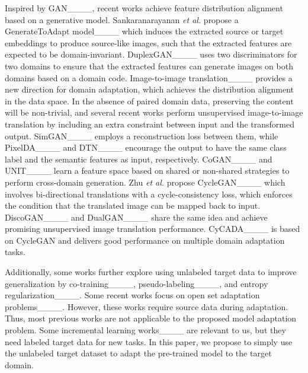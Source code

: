 Inspired by GAN____, recent works achieve feature distribution alignment based on a generative model. Sankaranarayanan \textit{et al.} propose a GenerateToAdapt model____ which induces the extracted source or target embeddings to produce source-like images, such that the extracted features are expected to be domain-invariant. DuplexGAN____ uses two discriminators for two domains to ensure that the extracted features can generate images on both domains based on a domain code. Image-to-image translation____ provides a new direction for domain adaptation, which achieves the distribution alignment in the data space. In the absence of paired domain data, preserving the content will be non-trivial, and several recent works perform unsupervised image-to-image translation by including an extra constraint between input and the transformed output. SimGAN____ employs a reconstruction loss between them, while PixelDA____ and DTN____ encourage the output to have the same class label and the semantic features as input, respectively. CoGAN____ and UNIT____ learn a feature space based on shared or non-shared strategies to perform cross-domain generation. Zhu \textit{et al.} propose CycleGAN____ which involves bi-directional translations with a cycle-consistency loss, which enforces the condition that the translated image can be mapped back to input. DiscoGAN____ and DualGAN____ share the same idea and achieve promising unsupervised image translation performance. CyCADA____ is based on CycleGAN and delivers good performance on multiple domain adaptation tasks.

Additionally, some works further explore using unlabeled target data to improve generalization by co-training____, pseudo-labeling____, and entropy regularization____. Some recent works focus on open set adaptation problems____. However, these works require source data during adaptation. Thus, most previous works are not applicable to the proposed model adaptation problem. Some incremental learning works____ are relevant to us, but they need labeled target data for new tasks. In this paper, we propose to simply use the unlabeled target dataset to adapt the pre-trained model to the target domain.